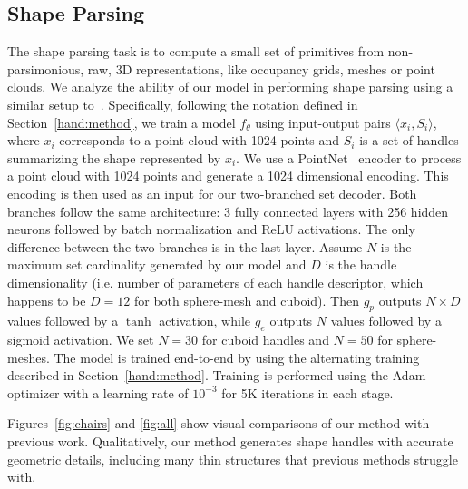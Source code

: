 \subsection{Shape Parsing}

The shape parsing task is to compute a small set of primitives from non-parsimonious,
raw, 3D representations, like occupancy grids, meshes or point clouds.
We analyze the ability of our model in performing shape parsing using a similar setup
to~\cite{Paschalidou2019, Tulsiani2017}.
Specifically, following the notation defined in Section~\ref{hand:method},
we train a model $f_\theta$ using input-output pairs $\langle x_i, S_i \rangle$, where
$x_i$ corresponds to a point cloud with 1024 points and $S_i$ is a set of handles
summarizing the shape represented by $x_i$.
We use a PointNet~\cite{pointnet} encoder to process
a point cloud with 1024 points and generate a 1024 dimensional encoding.
This encoding is then used as an input for our two-branched set decoder.
Both branches follow the same architecture: 3 fully connected layers with 256 hidden neurons
followed by batch normalization and ReLU activations.
The only difference between the two branches is in the last layer.
Assume $N$ is the maximum set cardinality generated by our model and $D$ is the handle
dimensionality (i.e. number of parameters of each handle descriptor, which happens to be $D=12$ for both sphere-mesh and cuboid). Then
$g_p$ outputs $N\times D$ values followed by a $\tanh$ activation, while $g_e$
outputs $N$ values followed by a sigmoid activation.
We set $N=30$ for cuboid handles and $N=50$ for sphere-meshes. %
The model is trained end-to-end by using the alternating training described in Section~\ref{hand:method}.
Training is performed using the Adam optimizer with a learning rate of $10^{-3}$ for 5K iterations
in each stage.

Figures~\ref{fig:chairs} and \ref{fig:all} show visual comparisons of our method with previous work. Qualitatively, our method generates shape handles with accurate geometric details, including many thin structures that previous methods struggle with. 

